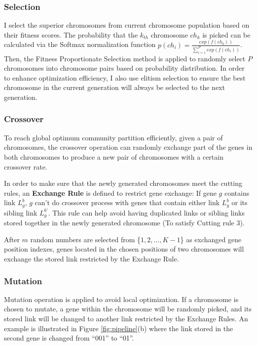 \subsubsection{Selection}

I select the superior chromosomes from current chromosome population based on their fitness scores. The probability that the $k_{th}$ chromosome $ch_k$ is picked can be calculated via the Softmax normalization function $p(ch_{i}) = \frac{exp(f(ch_{k}))}{\sum_{i=1}^{P}exp(f(ch_{i}))}$. Then, the Fitness Proportionate Selection method is applied to randomly select $P$ chromosomes into chromosome pairs based on probability distribution. In order to enhance optimization efficiency, I also use elitism selection to ensure the best chromosome in the current generation will always be selected to the next generation. 

\subsubsection{Crossover} 

To reach global optimum community partition efficiently, given a pair of chromosomes, the crossover operation can randomly exchange part of the genes in both chromosomes to produce a new pair of chromosomes with a certain crossover rate.

In order to make sure that the newly generated chromosomes meet the cutting rules, an \textbf{Exchange Rule} is defined to restrict gene exchange: If gene \textit{$g$} contains link $L^{b}_{g}$, \textit{$g$} can't do crossover process with genes that contain either link $L^{b}_{g}$ or its sibling link $L^{b'}_{g}$. This rule can help avoid having duplicated links or sibling links stored together in the newly generated chromosome (To satisfy Cutting rule 3). 

After \textit{$m$} random numbers are selected from \{$1,2,...,K-1$\} as exchanged gene position indexes, genes located in the chosen positions of two chromosomes will exchange the stored link restricted by the Exchange Rule.
\subsubsection{Mutation} 
Mutation operation is applied to avoid local optimization. If a chromosome is chosen to mutate, a gene within the chromosome will be randomly picked, and its stored link will be changed to another link restricted by the Exchange Rules. An example is illustrated in Figure \ref{fig:pipeline}(b) where the link stored in the second gene is changed from ``001'' to ``01''. 

